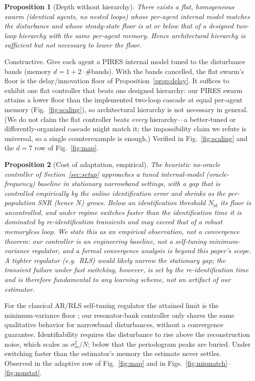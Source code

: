 \documentclass[journal]{IEEEtran}
\newtheorem{proposition}{Proposition}
\begin{document}
\begin{proposition}[Depth without hierarchy]\label{prop:depth}
There exists a flat, homogeneous swarm (identical agents, no nested loops) whose
per-agent internal model matches the disturbance and whose steady-state floor is
at or below that of a designed two-loop hierarchy with the same per-agent
memory. Hence architectural hierarchy is sufficient but not necessary to lower
the floor.
\end{proposition}
\begin{IEEEproof}
Constructive. Give each agent a PIRES internal model tuned to the disturbance
bands (memory $d = 1 + 2\cdot\#\text{bands}$). With the bands cancelled, the flat
swarm's floor is the delay/innovation floor of Proposition~\ref{prop:delay}. It
suffices to exhibit one flat controller that beats one designed hierarchy: our
PIRES swarm attains a lower floor than the implemented two-loop cascade at equal
per-agent memory (Fig.~\ref{fig:scaling}), so architectural hierarchy is not
necessary in general. (We do not claim the flat controller beats \emph{every}
hierarchy---a better-tuned or differently-organized cascade might match it; the
impossibility claim we refute is universal, so a single counterexample is
enough.) Verified in Fig.~\ref{fig:scaling} and the $d{=}7$ row of
Fig.~\ref{fig:map}.
\end{IEEEproof}

\begin{proposition}[Cost of adaptation, empirical]\label{prop:adapt}
The heuristic no-oracle controller of Section~\ref{sec:setup} approaches a tuned
internal-model (oracle-frequency) baseline in stationary narrowband settings,
with a gap that is controlled empirically by the online identification error and
shrinks as the per-population SNR (hence $N$) grows. Below an identification
threshold $N_{\mathrm{id}}$ its floor is uncontrolled, and under regime switches
faster than the identification time it is dominated by re-identification
transients and may exceed that of a robust memoryless loop. We state this as an
empirical observation, not a convergence theorem: our controller is an
engineering baseline, not a self-tuning minimum-variance regulator, and a formal
convergence analysis is beyond this paper's scope. A tighter regulator (e.g.\
RLS) would likely narrow the stationary gap; the transient failure under fast
switching, however, is set by the re-identification time and is therefore
fundamental to any learning scheme, not an artifact of our estimator.
\end{proposition}
\begin{IEEEproof}[Justification]
For the classical AR/RLS self-tuning regulator the attained limit is the
minimum-variance floor \cite{astrom1973}; our resonator-bank controller only
shares the same qualitative behavior for narrowband disturbances, without a
convergence guarantee. Identifiability requires the disturbance to rise above the
reconstruction noise, which scales as $\sigma_m^2/N$; below that the periodogram
peaks are buried. Under switching faster than the estimator's memory the estimate
never settles. Observed in the adaptive row of Fig.~\ref{fig:map} and in
Figs.~\ref{fig:mismatch}--\ref{fig:nonstat}.
\end{IEEEproof}
\end{document}
